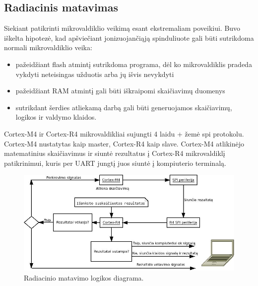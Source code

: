 \documentclass[a4paper, 12pt]{article} %
\begin{document}
\begin{onehalfspacing}
\subsection{Radiacinis matavimas}
Siekiant patikrinti mikrovaldiklio veikim\k{a} esant ekstremaliam poveikiui. Buvo i\v{s}kelta hipotez\.{e}, kad ap\v{s}vie\v{c}iant jonizuojan\v{c}i\k{a}j\k{a} spinduliuote gali b\={u}ti sutrikdoma normali mikrovaldiklio veika:
\begin{itemize}
\item pa\v{z}eid\v{z}iant flash atmint\k{i} sutrikdoma programa, d\.{e}l ko mikrovaldiklis pradeda vykdyti neteisingas u\v{z}duotis arba j\k{u} i\v{s}vis nevykdyti
\item pa\v{z}eid\v{z}iant RAM atmint\k{i} gali b\={u}ti i\v{s}kraipomi skai\v{c}iavim\k{u} duomenys
\item sutrikdant \v{s}erdies atliekam\k{a} darb\k{a} gali b\={u}ti generuojamos skai\v{c}iavim\k{u}, logikos ir valdymo klaidos.
\end{itemize} 
Cortex-M4 ir Cortex-R4 mikrovaldikliai sujungti 4 laidu + \v{z}em\.{e} spi protokolu. Cortex-M4 nustatytas kaip master, Cortex-R4 kaip slave.
Cortex-M4 atlikin\.{e}jo matematinius skai\v{c}iavimus ir siunt\.{e} rezultatus \k{i} Cortex-R4 mikrovaldikl\k{i} patikrinimui, kuris per UART jungt\k{i} juos siunt\.{e} \k{i} kompiuterio terminal\k{a}.  
\begin{figure}[H] %
\centering %
\includegraphics[scale=0.6]{pav/raddiag.jpg} %
\captionsetup{labelformat=numbfirst} %
\captionsetup{labelseparator=tarpas}
\caption{Radiacinio matavimo logikos diagrama.}
\label{vienas}
\end{figure}
\newpage
   

\end{onehalfspacing}
\end{document}
